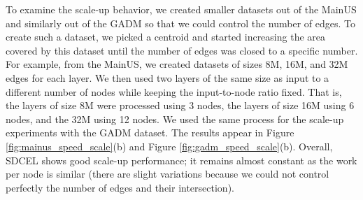 To examine the scale-up behavior, we created smaller datasets out of the MainUS and similarly out of the GADM so that we could control the number of edges. To create such a dataset, we picked a centroid and started increasing the area covered by this dataset until the number of edges was closed to a specific number. For example, from the MainUS, we created datasets of sizes 8M, 16M, and 32M edges for each layer. We then used two layers of the same size as input to a different number of nodes while keeping the input-to-node ratio fixed. That is, the layers of size 8M were processed using 3 nodes, the layers of size 16M using 6 nodes, and the 32M using 12 nodes. We used the same process for the scale-up experiments with the GADM dataset. The results appear in Figure \ref{fig:mainus_speed_scale}(b) and Figure \ref{fig:gadm_speed_scale}(b).  Overall, SDCEL shows good scale-up performance; it remains almost constant as the work per node is similar (there are slight variations because we could not control perfectly the number of edges and their intersection).




